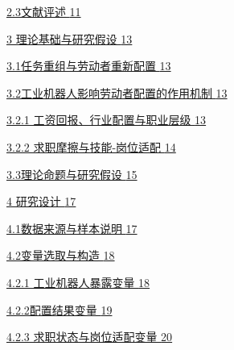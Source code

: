 \hyperref[ux6587ux732eux8bc4ux8ff0]{2.3文献评述 \hyperref[ux6587ux732eux8bc4ux8ff0]{11}}

\hyperref[ux7406ux8bbaux57faux7840ux4e0eux7814ux7a76ux5047ux8bbe]{3 理论基础与研究假设 \hyperref[ux7406ux8bbaux57faux7840ux4e0eux7814ux7a76ux5047ux8bbe]{13}}

\hyperref[ux4efbux52a1ux91cdux7ec4ux4e0eux52b3ux52a8ux8005ux91cdux65b0ux914dux7f6e]{3.1任务重组与劳动者重新配置 \hyperref[ux4efbux52a1ux91cdux7ec4ux4e0eux52b3ux52a8ux8005ux91cdux65b0ux914dux7f6e]{13}}

\hyperref[ux5de5ux4e1aux673aux5668ux4ebaux5f71ux54cdux52b3ux52a8ux8005ux914dux7f6eux7684ux4f5cux7528ux673aux5236]{3.2工业机器人影响劳动者配置的作用机制 \hyperref[ux5de5ux4e1aux673aux5668ux4ebaux5f71ux54cdux52b3ux52a8ux8005ux914dux7f6eux7684ux4f5cux7528ux673aux5236]{13}}

\hyperref[ux5de5ux8d44ux56deux62a5ux884cux4e1aux914dux7f6eux4e0eux804cux4e1aux5c42ux7ea7]{3.2.1 工资回报、行业配置与职业层级 \hyperref[ux5de5ux8d44ux56deux62a5ux884cux4e1aux914dux7f6eux4e0eux804cux4e1aux5c42ux7ea7]{13}}

\hyperref[ux6c42ux804cux6469ux64e6ux4e0eux6280ux80fd-ux5c97ux4f4dux9002ux914d]{3.2.2 求职摩擦与技能-岗位适配 \hyperref[ux6c42ux804cux6469ux64e6ux4e0eux6280ux80fd-ux5c97ux4f4dux9002ux914d]{14}}

\hyperref[ux7406ux8bbaux547dux9898ux4e0eux7814ux7a76ux5047ux8bbe]{3.3理论命题与研究假设 \hyperref[ux7406ux8bbaux547dux9898ux4e0eux7814ux7a76ux5047ux8bbe]{15}}

\hyperref[ux7814ux7a76ux8bbeux8ba1]{4 研究设计 \hyperref[ux7814ux7a76ux8bbeux8ba1]{17}}

\hyperref[ux6570ux636eux6765ux6e90ux4e0eux6837ux672cux8bf4ux660e]{4.1数据来源与样本说明 \hyperref[ux6570ux636eux6765ux6e90ux4e0eux6837ux672cux8bf4ux660e]{17}}

\hyperref[ux53d8ux91cfux9009ux53d6ux4e0eux6784ux9020]{4.2变量选取与构造 \hyperref[ux53d8ux91cfux9009ux53d6ux4e0eux6784ux9020]{18}}

\hyperref[ux5de5ux4e1aux673aux5668ux4ebaux66b4ux9732ux53d8ux91cf]{4.2.1 工业机器人暴露变量 \hyperref[ux5de5ux4e1aux673aux5668ux4ebaux66b4ux9732ux53d8ux91cf]{18}}

\hyperref[ux914dux7f6eux7ed3ux679cux53d8ux91cf]{4.2.2配置结果变量 \hyperref[ux914dux7f6eux7ed3ux679cux53d8ux91cf]{19}}

\hyperref[ux6c42ux804cux72b6ux6001ux4e0eux5c97ux4f4dux9002ux914dux53d8ux91cf]{4.2.3 求职状态与岗位适配变量 \hyperref[ux6c42ux804cux72b6ux6001ux4e0eux5c97ux4f4dux9002ux914dux53d8ux91cf]{20}}

